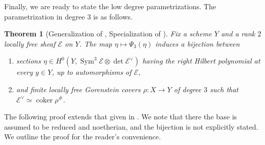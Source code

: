 \documentclass[12 pt]{amsart}
\theoremstyle{plain}
\newtheorem{theorem}[subsection]{Theorem}
\theoremstyle{definition}
\theoremstyle{remark}
\numberwithin{equation}{section}
\newcommand\bp{\mathbb P}
\newcommand\sce{\mathscr E}
\newcommand \ra{\rightarrow}
\DeclareMathOperator\coker{coker}
\DeclareMathOperator\sym{Sym}
\begin{document}
Finally, we are ready to state the low degree parametrizations.
The parametrization in degree $3$ is as follows.

\begin{theorem}[Generalization of , Specialization of {\cite[Prop. \ 5.1]{Poonen2008}}] \label{theorem:3-structure}
	Fix a scheme $Y$ and a rank $2$ locally free sheaf $\sce$ on $Y$. 
	The map $\eta \mapsto \Psi_3(\eta)$ induces
	a bijection between 
	\begin{enumerate}
		\item sections $\eta \in H^0(Y, \sym^3 \sce
	\otimes \det \sce^{\vee})$ having the right Hilbert polynomial at every $y \in
	Y$, up to automorphisms of $\sce$, 
		\item and finite locally free Gorenstein covers $\rho: X
			\ra Y$ of degree $3$ such that $\sce^\vee \simeq \coker \rho^\#$.
	\end{enumerate}
\end{theorem} The following proof extends that given in
\cite[Thm.\  3.4]{casnatiE:covers-algebraic-varieties}.  We note that there the
base is assumed to be reduced and noetherian, and the bijection is not
explicitly stated.  We outline the proof for the reader's convenience.
\end{document}
